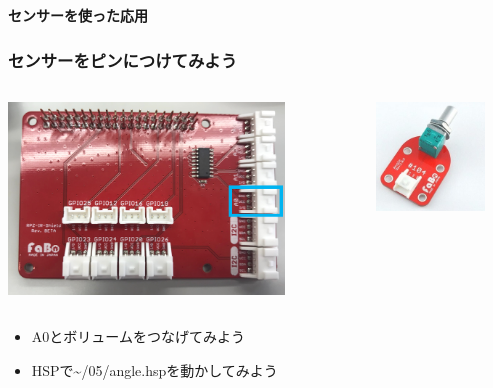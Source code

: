 \begin{frame}[plain]
    \begin{center}
        \vspace{48pt}
        {\huge\bf センサーを使った応用}
    \end{center}
\end{frame}

\begin{frame}
    \frametitle{センサーをピンにつけてみよう}
    \begin{center}
        \begin{columns}
            \begin{column}{0.48\textwidth}
                \includegraphics[width=0.8\textwidth]{images/chap05/text05-img030.png}
            \end{column}
            \begin{column}{0.48\textwidth}
                \includegraphics[width=0.8\textwidth]{images/chap05/text05-img022.jpg} 
            \end{column}
        \end{columns}
        \begin{itemize}
            \item A0とボリュームをつなげてみよう
            \item HSPで\textasciitilde/05/angle.hspを動かしてみよう
        \end{itemize}
    \end{center}
\end{frame}

